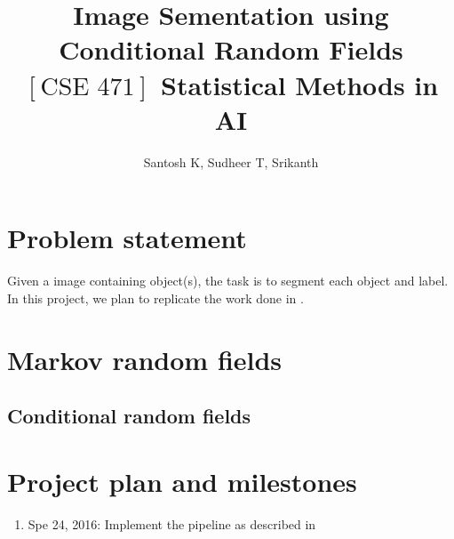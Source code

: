 \documentclass[a4paper, 9pt]{article}
\title{Image Sementation using Conditional Random Fields \\
	  $[\textrm{CSE 471}]$ Statistical Methods in AI}
\author{Santosh K, Sudheer T, Srikanth}
\begin{document}
\maketitle

\begin{abstract}

\end{abstract}

\section{Problem statement}
Given a image containing object(s), the task is to segment each object and label. In this project, we plan to replicate the work done in \cite{icml_2009}. 

\section{Markov random fields}

\subsection{Conditional random fields}


\section{Project plan and milestones}

\begin{enumerate}
	\item Spe 24, 2016: Implement the pipeline as described in 
\end{enumerate}



\end{document}
